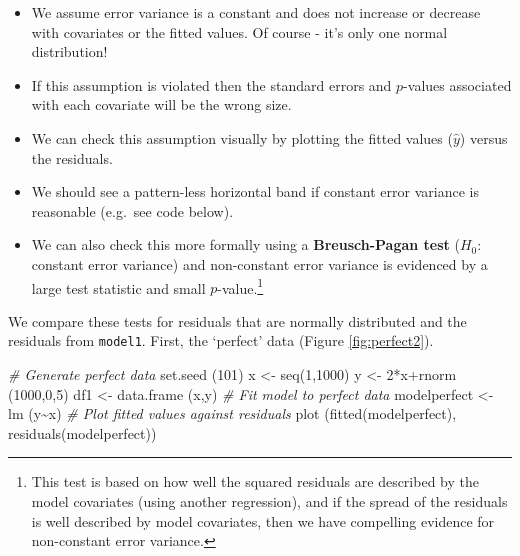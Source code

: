 \documentclass[
  oneside]{krantz}
\newenvironment{Shaded}{\begin{snugshade}}{\end{snugshade}}
\newcommand{\CommentTok}[1]{\textcolor[rgb]{0.56,0.35,0.01}{\textit{#1}}}
\newcommand{\DecValTok}[1]{\textcolor[rgb]{0.00,0.00,0.81}{#1}}
\newcommand{\FunctionTok}[1]{\textcolor[rgb]{0.00,0.00,0.00}{#1}}
\newcommand{\NormalTok}[1]{#1}
\newcommand{\OtherTok}[1]{\textcolor[rgb]{0.56,0.35,0.01}{#1}}
\newcommand{\SpecialCharTok}[1]{\textcolor[rgb]{0.00,0.00,0.00}{#1}}
\begin{document}
\begin{itemize}
\item
  We assume error variance is a constant and does not increase or decrease with covariates or the fitted values. Of course - it's only one normal distribution!
\item
  If this assumption is violated then the standard errors and \(p\)-values associated with each covariate will be the wrong size.
\item
  We can check this assumption visually by plotting the fitted values (\(\hat{y}\)) versus the residuals.
\item
  We should see a pattern-less horizontal band if constant error variance is reasonable (e.g.~see code below).
\item
  We can also check this more formally using a \textbf{Breusch-Pagan test} (\(H_0\): constant error variance) and non-constant error variance is evidenced by a large test statistic and small \(p\)-value.\footnote{This test is based on how well the squared residuals are described by the model covariates (using another regression), and if the spread of the residuals is well described by model covariates, then we have compelling evidence for non-constant error variance.}
\end{itemize}

We compare these tests for residuals that are normally distributed and the residuals from \texttt{model1}. First, the `perfect' data (Figure \ref{fig:perfect2}).

\begin{Shaded}
\begin{Highlighting}[]
\CommentTok{\# Generate perfect data}
\FunctionTok{set.seed}\NormalTok{ (}\DecValTok{101}\NormalTok{)}
\NormalTok{x }\OtherTok{\textless{}{-}} \FunctionTok{seq}\NormalTok{(}\DecValTok{1}\NormalTok{,}\DecValTok{1000}\NormalTok{)}
\NormalTok{y }\OtherTok{\textless{}{-}} \DecValTok{2}\SpecialCharTok{*}\NormalTok{x}\SpecialCharTok{+}\FunctionTok{rnorm}\NormalTok{ (}\DecValTok{1000}\NormalTok{,}\DecValTok{0}\NormalTok{,}\DecValTok{5}\NormalTok{)}
\NormalTok{df1 }\OtherTok{\textless{}{-}} \FunctionTok{data.frame}\NormalTok{ (x,y)}
\CommentTok{\# Fit model to perfect data}
\NormalTok{modelperfect }\OtherTok{\textless{}{-}} \FunctionTok{lm}\NormalTok{ (y}\SpecialCharTok{\textasciitilde{}}\NormalTok{x)}
\CommentTok{\# Plot fitted values against residuals}
\FunctionTok{plot}\NormalTok{ (}\FunctionTok{fitted}\NormalTok{(modelperfect), }\FunctionTok{residuals}\NormalTok{(modelperfect))}
\end{Highlighting}
\end{Shaded}
\end{document}
